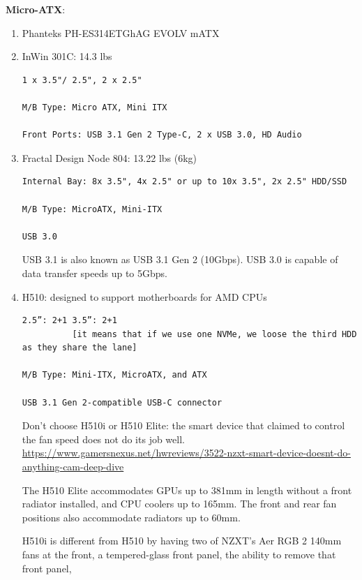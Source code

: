 {\bf Micro-ATX}:
\begin{enumerate}
  
  \item Phanteks PH-ES314ETGhAG EVOLV mATX 
  
  
  \item InWin 301C: 14.3 lbs
  
\begin{verbatim}
1 x 3.5"/ 2.5", 2 x 2.5"

M/B Type: Micro ATX, Mini ITX

Front Ports: USB 3.1 Gen 2 Type-C, 2 x USB 3.0, HD Audio
\end{verbatim}  
  
  \item Fractal Design Node 804: 13.22 lbs (6kg)
  
\begin{verbatim}
Internal Bay: 8x 3.5", 4x 2.5" or up to 10x 3.5", 2x 2.5" HDD/SSD

M/B Type: MicroATX, Mini-ITX

USB 3.0
\end{verbatim}
  
USB 3.1 is also known as USB 3.1 Gen 2 (10Gbps). USB 3.0 is capable of data
transfer speeds up to 5Gbps.

  \item  H510: designed to support motherboards for AMD CPUs
  
\begin{verbatim}
2.5”: 2+1 3.5”: 2+1 
          [it means that if we use one NVMe, we loose the third HDD as they share the lane]

M/B Type: Mini-ITX, MicroATX, and ATX

USB 3.1 Gen 2-compatible USB-C connector 
\end{verbatim}

Don't choose  H510i or H510 Elite: the smart device that claimed to control the
fan speed does not do its job well.
\url{https://www.gamersnexus.net/hwreviews/3522-nzxt-smart-device-doesnt-do-anything-cam-deep-dive}

The H510 Elite accommodates GPUs up to 381mm in length without a front radiator
installed, and CPU coolers up to 165mm. The front and rear fan positions also
accommodate radiators up to 60mm.

H510i is different from H510 by having two of NZXT’s Aer RGB 2 140mm fans at the
front, a tempered-glass front panel, the ability to remove that front panel,

\end{enumerate}


